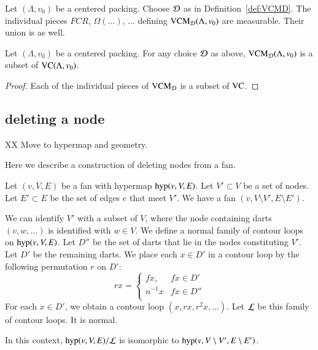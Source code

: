 \begin{lemma}
Let $(\Lambda,v_0)$ be a centered packing.  Choose ${\mathcal D}$ as in Definition~\ref{def:VCMD}.  
The individual pieces $FCR$, $\Omega(\ldots)$, $\ldots$ 
defining ${\operatorname{VCM}}_{{\mathcal D}}(\Lambda,v_0)$ are measurable.  Their union is as well.
\end{lemma}

\begin{lemma}
Let $(\Lambda,v_0)$ be a centered packing.
For any choice ${\mathcal D}$ as above,  ${\operatorname{VCM}}_{{\mathcal D}}(\Lambda,v_0)$ is a subset of ${\operatorname{VC}}(\Lambda,v_0)$.
\end{lemma}

\begin{proof}  Each of the individual pieces of ${\operatorname{VCM}}_{{\mathcal D}}$ is a subset of ${\operatorname{VC}}$.
\end{proof}

\subsection{deleting a node}

 XX Move to hypermap and geometry.

Here we describe a construction of deleting nodes from a 
fan.  


Let $(v,V,E)$ be a fan with hypermap ${\operatorname{hyp}}(v,V,E)$.
Let $V'\subset V$ be a set of nodes. 
Let $E'\subset E$ be the set of edges $e$ that meet $V'$.
We have a fan $(v,V\setminus V',E\setminus E')$.

We can identify $V'$ with a subset of $V$, where
the node containing darts $(v,w,\ldots)$ is identified with $w\in V$.
We define a normal family of contour loops on 
${\operatorname{hyp}}(v,V,E)$.  Let $D''$ be the set of darts that lie in the
nodes constituting $V'$.  Let $D'$ be the remaining darts.
We place each $x\in D'$ in a contour
loop by the following permutation $r$ on $D'$:
    $$r x =
    \begin{cases}
    f x, & f x \in D'\\
    n^{-1} x & f x \in D''\\
    \end{cases}
    $$
For each $x\in D'$, we obtain a contour loop $(x,r x, r^2 x,\ldots)$.
Let $\cal L$ be this family of contour loops.  It is normal.

\begin{lemma}
In this context,
$\op{hyp}(v,V,E)/{\cal L}$ is isomorphic to 
${\operatorname{hyp}}(v,V\setminus V',E\setminus E')$.
\end{lemma}



